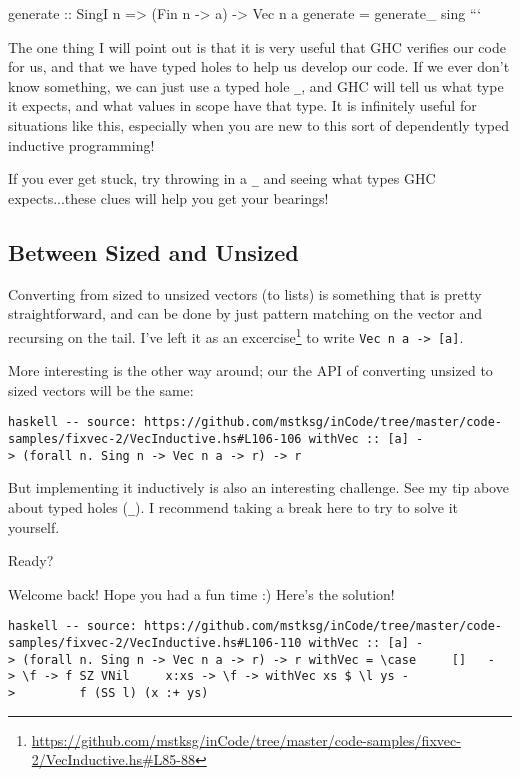 \documentclass[]{article}
\renewcommand{\href}[2]{#2\footnote{\url{#1}}}
\begin{document}
generate :: SingI n =\textgreater{} (Fin n -\textgreater{} a) -\textgreater{}
Vec n a generate = generate\_ sing ```

The one thing I will point out is that it is very useful that GHC verifies our
code for us, and that we have typed holes to help us develop our code. If we
ever don't know something, we can just use a typed hole \texttt{\_}, and GHC
will tell us what type it expects, and what values in scope have that type. It
is infinitely useful for situations like this, especially when you are new to
this sort of dependently typed inductive programming!

If you ever get stuck, try throwing in a \texttt{\_} and seeing what types GHC
expects...these clues will help you get your bearings!

\subsection{Between Sized and Unsized}

Converting from sized to unsized vectors (to lists) is something that is pretty
straightforward, and can be done by just pattern matching on the vector and
recursing on the tail. I've
\href{https://github.com/mstksg/inCode/tree/master/code-samples/fixvec-2/VecInductive.hs\#L85-88}{left
it as an excercise} to write \texttt{Vec\ n\ a\ -\textgreater{}\ {[}a{]}}.

More interesting is the other way around; our the API of converting unsized to
sized vectors will be the same:

\texttt{haskell\ -\/-\ source:\ https://github.com/mstksg/inCode/tree/master/code-samples/fixvec-2/VecInductive.hs\#L106-106\ withVec\ ::\ {[}a{]}\ -\textgreater{}\ (forall\ n.\ Sing\ n\ -\textgreater{}\ Vec\ n\ a\ -\textgreater{}\ r)\ -\textgreater{}\ r}

But implementing it inductively is also an interesting challenge. See my tip
above about typed holes (\texttt{\_}). I recommend taking a break here to try to
solve it yourself.

Ready?

Welcome back! Hope you had a fun time :) Here's the solution!

\texttt{haskell\ -\/-\ source:\ https://github.com/mstksg/inCode/tree/master/code-samples/fixvec-2/VecInductive.hs\#L106-110\ withVec\ ::\ {[}a{]}\ -\textgreater{}\ (forall\ n.\ Sing\ n\ -\textgreater{}\ Vec\ n\ a\ -\textgreater{}\ r)\ -\textgreater{}\ r\ withVec\ =\ \textbackslash{}case\ \ \ \ \ {[}{]}\ \ \ -\textgreater{}\ \textbackslash{}f\ -\textgreater{}\ f\ SZ\ VNil\ \ \ \ \ x:xs\ -\textgreater{}\ \textbackslash{}f\ -\textgreater{}\ withVec\ xs\ \$\ \textbackslash{}l\ ys\ -\textgreater{}\ \ \ \ \ \ \ \ \ f\ (SS\ l)\ (x\ :+\ ys)}
\end{document}
